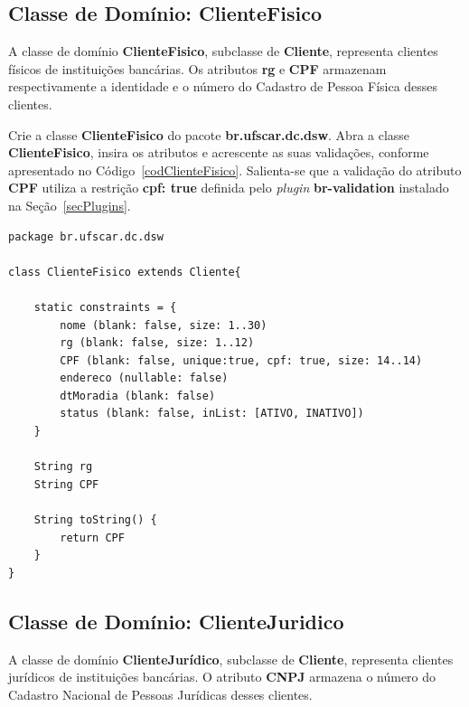 \newpage

\subsection{Classe de Domínio: ClienteFisico}\label{secClienteFisico}

\vspace{0.5cm}

A classe de domínio {\bf  ClienteFisico}, subclasse de {\bf Cliente}, representa
clientes físicos  de instituições bancárias. Os  atributos {\bf rg}  e {\bf CPF}
armazenam respectivamente a  identidade e o número do  Cadastro de Pessoa Física
desses clientes.  

Crie  a classe  {\bf ClienteFisico}  do pacote  {\bf br.ufscar.dc.dsw}.   Abra a
classe {\bf ClienteFisico}, insira os atributos e acrescente as suas validações,
conforme  apresentado   no  Código~\ref{codClienteFisico}.  Salienta-se   que  a
validação do  atributo {\bf  CPF} utiliza a  restrição {\bf cpf:  true} definida
pelo {\it plugin} {\bf br-validation} instalado na Seção~\ref{secPlugins}. 

\begin{lstlisting}[caption=Classe de domínio  {\bf ClienteFisico}, frame = trBL,
    float=htbp, label=codClienteFisico] 
package br.ufscar.dc.dsw

class ClienteFisico extends Cliente{
    
    static constraints = {
        nome (blank: false, size: 1..30)
        rg (blank: false, size: 1..12)
        CPF (blank: false, unique:true, cpf: true, size: 14..14)
        endereco (nullable: false)
        dtMoradia (blank: false)
        status (blank: false, inList: [ATIVO, INATIVO])
    }
    
    String rg    
    String CPF
    
    String toString() {
        return CPF
    }
}
\end{lstlisting}

\subsection{Classe de Domínio: ClienteJuridico}\label{secClienteJuridico}

\vspace{0.5cm}

A  classe  de  domínio   {\bf  ClienteJurídico},  subclasse  de  {\bf  Cliente},
representa clientes  jurídicos de instituições bancárias. O  atributo {\bf CNPJ}
armazena o número do Cadastro Nacional de Pessoas Jurídicas desses clientes. 

